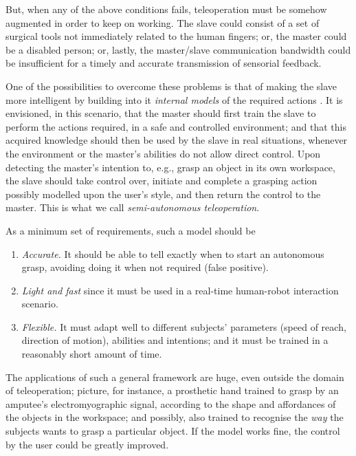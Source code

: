 \documentclass{article}
\begin{document}
But, when any of the above conditions fails, teleoperation must be
somehow augmented in order to keep on working. The slave could consist
of a set of surgical tools \cite{okamura} not immediately related to
the human fingers; or, the master could be a disabled person; or,
lastly, the master/slave communication bandwidth could be insufficient
for a timely and accurate transmission of sensorial feedback.

One of the possibilities to overcome these problems is that of making
the slave more intelligent by building into it \emph{internal models}
of the required actions \cite{kawato-99}. It is envisioned, in this
scenario, that the master should first train the slave to perform the
actions required, in a safe and controlled environment; and that this
acquired knowledge should then be used by the slave in real
situations, whenever the environment or the master's abilities do not
allow direct control. Upon detecting the master's intention to, e.g.,
grasp an object in its own workspace, the slave should take control
over, initiate and complete a grasping action possibly modelled upon
the user's style, and then return the control to the master. This is
what we call \emph{semi-autonomous teleoperation}.

As a minimum set of requirements, such a model should be

\begin{enumerate}

  \item \emph{Accurate.} It should be able to tell exactly when to
    start an autonomous grasp, avoiding doing it when not required
    (false positive).

  \item \emph{Light and fast} since it must be used in a real-time
    human-robot interaction scenario.

  \item \emph{Flexible.} It must adapt well to different subjects'
    parameters (speed of reach, direction of motion), abilities and
    intentions; and it must be trained in a reasonably short amount of
    time.

\end{enumerate}

The applications of such a general framework are huge, even outside
the domain of teleoperation; picture, for instance, a prosthetic hand
trained to grasp by an amputee's electromyographic signal, according
to the shape and affordances of the objects in the workspace; and
possibly, also trained to recognise the \emph{way} the subjects wants
to grasp a particular object. If the model works fine, the control by
the user could be greatly improved.
\end{document}
